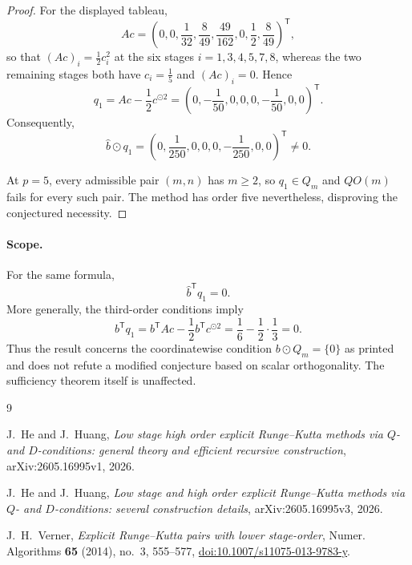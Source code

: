 \documentclass[11pt]{amsart}
\begin{document}
\begin{proof}
For the displayed tableau,
\[
Ac
 =\left(
  0,0,\frac1{32},\frac8{49},\frac{49}{162},
  0,\frac12,\frac8{49}
 \right)^{\mathsf T},
\]
so that \((Ac)_i=\frac12c_i^2\) at the six stages \(i=1,3,4,5,7,8\),
whereas the two remaining stages both have \(c_i=\frac15\) and
\((Ac)_i=0\). Hence
\[
q_1
 =Ac-\frac12c^{\odot2}
 =\left(
  0,-\frac1{50},0,0,0,-\frac1{50},0,0
 \right)^{\mathsf T}.
\]
Consequently,
\[
\widehat b\odot q_1
 =\left(
  0,\frac1{250},0,0,0,-\frac1{250},0,0
 \right)^{\mathsf T}
 \ne0.
\]

At \(p=5\), every admissible pair \((m,n)\) has \(m\ge 2\), so
\(q_1\in Q_m\) and \(QO(m)\) fails for every such pair. The method has
order five nevertheless, disproving the conjectured necessity.
\end{proof}

\paragraph{Scope.}
For the same formula,
\[
\widehat b^{\mathsf T}q_1=0.
\]
More generally, the third-order conditions imply
\[
b^{\mathsf T}q_1
 =b^{\mathsf T}Ac-\frac12b^{\mathsf T}c^{\odot2}
 =\frac16-\frac12\cdot\frac13
 =0.
\]
Thus the result concerns the coordinatewise condition
\(b\odot Q_m=\{0\}\) as printed and does not refute a modified
conjecture based on scalar orthogonality. The sufficiency theorem
itself is unaffected.

\begin{thebibliography}{9}

J.~He and J.~Huang,
\emph{Low stage high order explicit Runge--Kutta methods via
\(Q\)- and \(D\)-conditions: general theory and efficient recursive
construction},
arXiv:2605.16995v1, 2026.

J.~He and J.~Huang,
\emph{Low stage and high order explicit Runge--Kutta methods via
\(Q\)- and \(D\)-conditions: several construction details},
arXiv:2605.16995v3, 2026.

J.~H.~Verner,
\emph{Explicit Runge--Kutta pairs with lower stage-order},
Numer. Algorithms \textbf{65} (2014), no.~3, 555--577,
\href{https://doi.org/10.1007/s11075-013-9783-y}
{doi:10.1007/s11075-013-9783-y}.

\end{thebibliography}
\end{document}
